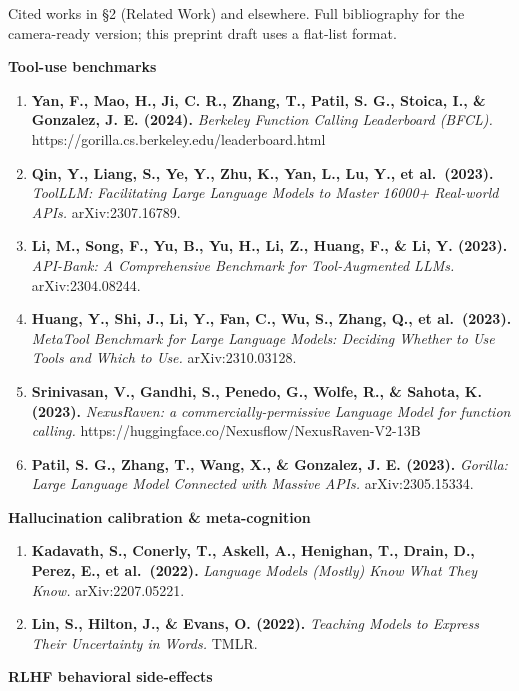 \documentclass[11pt]{article}
\providecommand{\tightlist}{\setlength{\itemsep}{0pt}\setlength{\parskip}{0pt}}
\begin{document}
Cited works in §2 (Related Work) and elsewhere. Full bibliography for
the camera-ready version; this preprint draft uses a flat-list format.

\textbf{Tool-use benchmarks}

\begin{enumerate}
\def\labelenumi{\arabic{enumi}.}
\tightlist
\item
  \textbf{Yan, F., Mao, H., Ji, C. R., Zhang, T., Patil, S. G., Stoica,
  I., \& Gonzalez, J. E. (2024).} \emph{Berkeley Function Calling
  Leaderboard (BFCL).} https://gorilla.cs.berkeley.edu/leaderboard.html
\item
  \textbf{Qin, Y., Liang, S., Ye, Y., Zhu, K., Yan, L., Lu, Y., et
  al.~(2023).} \emph{ToolLLM: Facilitating Large Language Models to
  Master 16000+ Real-world APIs.} arXiv:2307.16789.
\item
  \textbf{Li, M., Song, F., Yu, B., Yu, H., Li, Z., Huang, F., \& Li, Y.
  (2023).} \emph{API-Bank: A Comprehensive Benchmark for Tool-Augmented
  LLMs.} arXiv:2304.08244.
\item
  \textbf{Huang, Y., Shi, J., Li, Y., Fan, C., Wu, S., Zhang, Q., et
  al.~(2023).} \emph{MetaTool Benchmark for Large Language Models:
  Deciding Whether to Use Tools and Which to Use.} arXiv:2310.03128.
\item
  \textbf{Srinivasan, V., Gandhi, S., Penedo, G., Wolfe, R., \& Sahota,
  K. (2023).} \emph{NexusRaven: a commercially-permissive Language Model
  for function calling.}
  https://huggingface.co/Nexusflow/NexusRaven-V2-13B
\item
  \textbf{Patil, S. G., Zhang, T., Wang, X., \& Gonzalez, J. E. (2023).}
  \emph{Gorilla: Large Language Model Connected with Massive APIs.}
  arXiv:2305.15334.
\end{enumerate}

\textbf{Hallucination calibration \& meta-cognition}

\begin{enumerate}
\def\labelenumi{\arabic{enumi}.}
\setcounter{enumi}{6}
\tightlist
\item
  \textbf{Kadavath, S., Conerly, T., Askell, A., Henighan, T., Drain,
  D., Perez, E., et al.~(2022).} \emph{Language Models (Mostly) Know
  What They Know.} arXiv:2207.05221.
\item
  \textbf{Lin, S., Hilton, J., \& Evans, O. (2022).} \emph{Teaching
  Models to Express Their Uncertainty in Words.} TMLR.
\end{enumerate}

\textbf{RLHF behavioral side-effects}
\end{document}
